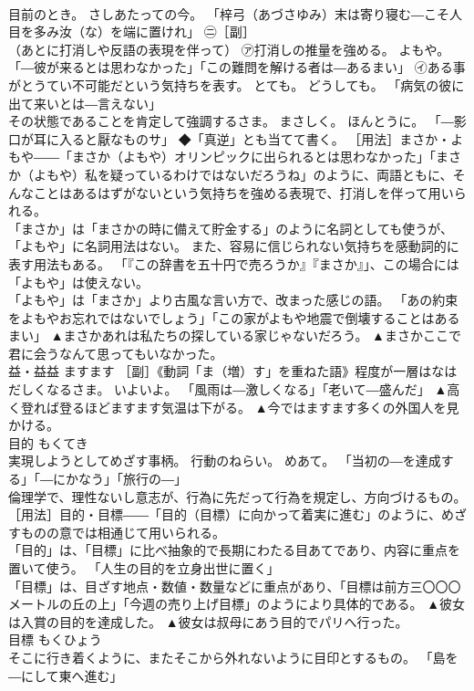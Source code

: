 \documentclass[8pt]{extreport}
\begin{document}
\begin{CJK}{UTF8}{min}
\\	目前のとき。 さしあたっての今。 「梓弓（あづさゆみ）末は寄り寝む―こそ人目を多み汝（な）を端に置けれ」 ㊁［副］ 
\\	（あとに打消しや反語の表現を伴って） ㋐打消しの推量を強める。 よもや。 「―彼が来るとは思わなかった」「この難問を解ける者は―あるまい」 ㋑ある事がとうてい不可能だという気持ちを表す。 とても。 どうしても。 「病気の彼に出て来いとは―言えない」 
\\	その状態であることを肯定して強調するさま。 まさしく。 ほんとうに。 「―影口が耳に入ると厭なものサ」 ◆「真逆」とも当てて書く。 ［用法］まさか・よもや――「まさか（よもや）オリンピックに出られるとは思わなかった」「まさか（よもや）私を疑っているわけではないだろうね」のように、両語ともに、そんなことはあるはずがないという気持ちを強める表現で、打消しを伴って用いられる。 
\\	「まさか」は「まさかの時に備えて貯金する」のように名詞としても使うが、「よもや」に名詞用法はない。 また、容易に信じられない気持ちを感動詞的に表す用法もある。 「『この辞書を五十円で売ろうか』『まさか』」、この場合には「よもや」は使えない。 
\\	「よもや」は「まさか」より古風な言い方で、改まった感じの語。 「あの約束をよもやお忘れではないでしょう」「この家がよもや地震で倒壊することはあるまい」	▲まさかあれは私たちの探している家じゃないだろう。 ▲まさかここで君に会うなんて思ってもいなかった。
\\	益・益益	ますます	［副］《動詞「ま（増）す」を重ねた語》程度が一層はなはだしくなるさま。 いよいよ。 「風雨は―激しくなる」「老いて―盛んだ」	▲高く登れば登るほどますます気温は下がる。 ▲今ではますます多くの外国人を見かける。
\\	目的	もくてき	
\\	実現しようとしてめざす事柄。 行動のねらい。 めあて。 「当初の―を達成する」「―にかなう」「旅行の―」 
\\	倫理学で、理性ないし意志が、行為に先だって行為を規定し、方向づけるもの。 ［用法］目的・目標――「目的（目標）に向かって着実に進む」のように、めざすものの意では相通じて用いられる。 
\\	「目的」は、「目標」に比べ抽象的で長期にわたる目あてであり、内容に重点を置いて使う。 「人生の目的を立身出世に置く」
\\	「目標」は、目ざす地点・数値・数量などに重点があり、「目標は前方三〇〇〇メートルの丘の上」「今週の売り上げ目標」のようにより具体的である。	▲彼女は入賞の目的を達成した。 ▲彼女は叔母にあう目的でパリへ行った。
\\	目標	もくひょう	
\\	そこに行き着くように、またそこから外れないように目印とするもの。 「島を―にして東へ進む」 

\end{CJK}
\end{document}
